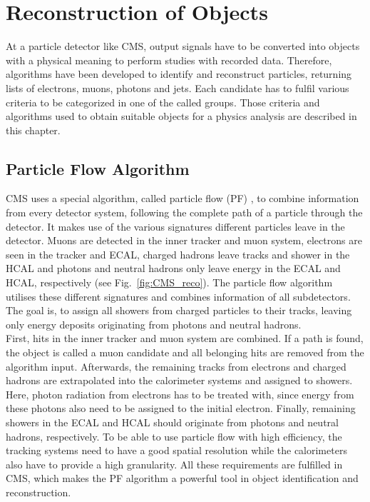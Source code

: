 \chapter{Reconstruction of Objects}
\label{ch:Reco}
	At a particle detector like CMS, output signals have to be converted into objects with a physical meaning to perform studies with recorded data. Therefore, algorithms have been developed to identify and reconstruct particles, returning lists of electrons, muons, photons and jets. Each candidate has to fulfil various criteria to be categorized in one of the called groups. Those criteria and algorithms used to obtain suitable objects for a physics analysis are described in this chapter.

\section{Particle Flow Algorithm}
\label{sec:pf}
	CMS uses a special algorithm, called particle flow (PF) \cite{particleflow}, to combine information from every detector system, following the complete path of a particle through the detector. It makes use of the various signatures different particles leave in the detector. Muons are detected in the inner tracker and muon system, electrons are seen in the tracker and ECAL, charged hadrons leave tracks and shower in the HCAL and photons and neutral hadrons only leave energy in the ECAL and HCAL, respectively (see Fig.~\ref{fig:CMS_reco}). The particle flow algorithm utilises these different signatures and combines information of all subdetectors. The goal is, to assign all showers from charged particles to their tracks, leaving only energy deposits originating from photons and neutral hadrons.\\
	First, hits in the inner tracker and muon system are combined. If a path is found, the object is called a muon candidate and all belonging hits are removed from the algorithm input. Afterwards, the remaining tracks from electrons and charged hadrons are extrapolated into the calorimeter systems and assigned to showers. Here, photon radiation from electrons has to be treated with, since energy from these photons also need to be assigned to the initial electron. Finally, remaining showers in the ECAL and HCAL should originate from photons and neutral hadrons, respectively. To be able to use particle flow with high efficiency, the tracking systems need to have a good spatial resolution while the calorimeters also have to provide a high granularity. All these requirements are fulfilled in CMS, which makes the PF algorithm a powerful tool in object identification and reconstruction.

